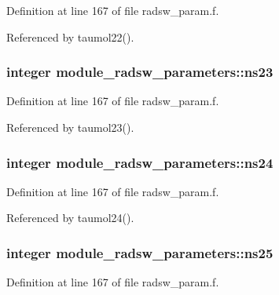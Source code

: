 Definition at line 167 of file radsw\+\_\+param.\+f.



Referenced by taumol22().

\subsubsection[{\texorpdfstring{ns23}{ns23}}]{\setlength{\rightskip}{0pt plus 5cm}integer module\+\_\+radsw\+\_\+parameters\+::ns23}\hypertarget{group__module__radsw__main_ga547ab92fedb3e35198b384f0337a752c}{}\label{group__module__radsw__main_ga547ab92fedb3e35198b384f0337a752c}


Definition at line 167 of file radsw\+\_\+param.\+f.



Referenced by taumol23().

\subsubsection[{\texorpdfstring{ns24}{ns24}}]{\setlength{\rightskip}{0pt plus 5cm}integer module\+\_\+radsw\+\_\+parameters\+::ns24}\hypertarget{group__module__radsw__main_ga3cdaa790f548b6407ba586a824c5edc6}{}\label{group__module__radsw__main_ga3cdaa790f548b6407ba586a824c5edc6}


Definition at line 167 of file radsw\+\_\+param.\+f.



Referenced by taumol24().

\subsubsection[{\texorpdfstring{ns25}{ns25}}]{\setlength{\rightskip}{0pt plus 5cm}integer module\+\_\+radsw\+\_\+parameters\+::ns25}\hypertarget{group__module__radsw__main_gabaf12fd8281745e299a942530cef1a97}{}\label{group__module__radsw__main_gabaf12fd8281745e299a942530cef1a97}


Definition at line 167 of file radsw\+\_\+param.\+f.




